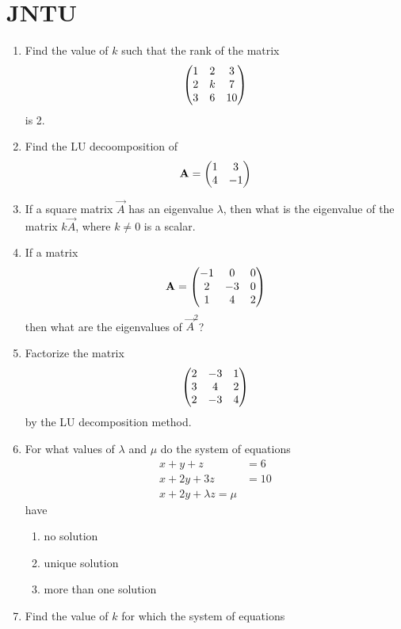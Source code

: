 \documentclass[journal,12pt,twocolumn]{IEEEtran}
\renewcommand\thesection{\arabic{section}}
\begin{document}
\section{JNTU}
\renewcommand{\theequation}{\theenumi}
\begin{enumerate}[label=\thesection.\arabic*.,ref=\thesection.\theenumi]
\item Find the value of $k$ such that the rank of the matrix
\begin{align}
	\begin{pmatrix}1 & 2 & 3\\2 & k & 7 \\ 3 & 6 & 10\end{pmatrix} 
\end{align}
is 2.
\item Find the LU decoomposition of 
\begin{align}
	\mathbf{A} = 	\begin{pmatrix}1 &  3\\ 4 & -1\end{pmatrix} 
\end{align}
\item If a square matrix $\vec{A}$ has an eigenvalue $\lambda $, then what is the eigenvalue of the matrix $k\vec{A}$, where $k \ne 0$ is a scalar.
\item If a matrix 
\begin{align}
	\mathbf{A} = 	\begin{pmatrix}-1 & 0 & 0\\2 & -3 & 0 \\ 1 & 4 & 2\end{pmatrix}
\end{align}
then what are the eigenvalues of $\vec{A}^2$?
\item Factorize the matrix 
\begin{align}
		\begin{pmatrix}2 & -3 & 1\\3 & 4 & 2 \\ 2 & -3 & 4\end{pmatrix}
\end{align}
by the LU decomposition method.
\item For what values of $\lambda$ and $\mu$ do the system of equations
\begin{align}
	x+y+z &= 6
	\\
	x+2y+3z &= 10
	\\
	x+2y+\lambda z = \mu
\end{align}
have
		\begin{enumerate}
			\item no solution
			\item unique solution
			\item more than one solution
				\end{enumerate}
			\item Find the value of $k$ for which the system of equations

\end{enumerate}
\end{document}
